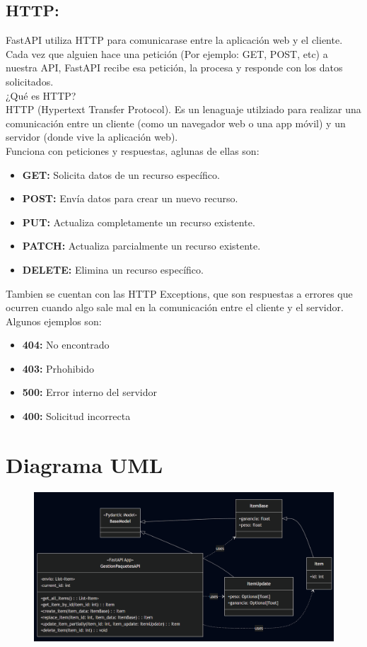 \documentclass[12pt]{article}
\begin{document}
\subsection*{HTTP:}
FastAPI utiliza HTTP para comunicarase entre la aplicación web y el cliente. Cada vez que alguien hace una petición (Por ejemplo: GET, POST, etc) a nuestra API, FastAPI recibe esa petición, la procesa y responde con los datos solicitados.\\

¿Qué es HTTP?\\
HTTP (Hypertext Transfer Protocol). Es un lenaguaje utilziado para realizar una comunicación entre un cliente (como un navegador web o una app móvil) y un servidor (donde vive la aplicación web).\\
Funciona con peticiones y respuestas, aglunas de ellas son:
\begin{itemize}
    \item \textbf{GET:} Solicita datos de un recurso específico.
    \item \textbf{POST:} Envía datos para crear un nuevo recurso.
    \item \textbf{PUT:} Actualiza completamente un recurso existente.
    \item \textbf{PATCH:} Actualiza parcialmente un recurso existente.
    \item \textbf{DELETE:} Elimina un recurso específico.
\end{itemize}

Tambien se cuentan con las HTTP Exceptions, que son respuestas a errores que ocurren cuando algo sale mal en la comunicación entre el cliente y el servidor.\\
Algunos ejemplos son:
\begin{itemize}
    \item \textbf{404:} No encontrado
    \item \textbf{403:} Prhohibido
    \item \textbf{500:} Error interno del servidor
    \item \textbf{400:} Solicitud incorrecta  
\end{itemize}

\section{Diagrama UML}
\begin{figure}[H]
    \centering
    \includegraphics[width=1\textwidth]{Imagenes/Diagrama UML.png}
\end{figure}
\end{document}
